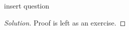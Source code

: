 \begin{solution}{2.2}
    \begin{question}
        insert question    
    \end{question}
    \tcblower{}
    \begin{proof}[Solution]
        Proof is left as an exercise.
    \end{proof}
\end{solution}
